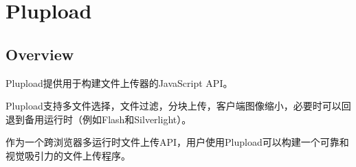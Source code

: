 \part{Plupload}


\chapter{Overview}


Plupload提供用于构建文件上传器的JavaScript API。 

Plupload支持多文件选择，文件过滤，分块上传，客户端图像缩小，必要时可以回退到备用运行时（例如Flash和Silverlight）。


作为一个跨浏览器多运行时文件上传API，用户使用Plupload可以构建一个可靠和视觉吸引力的文件上传程序。